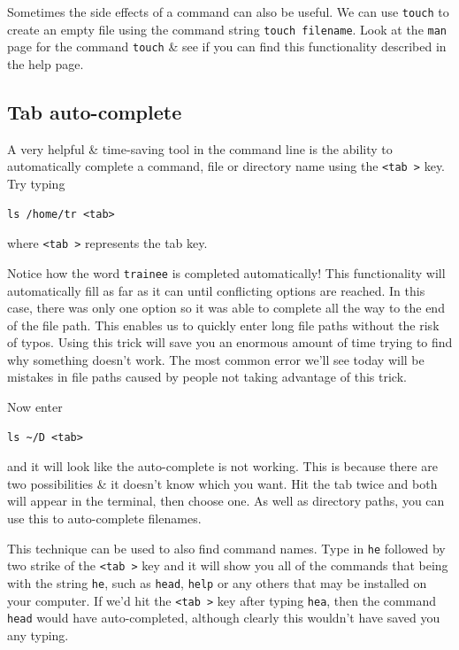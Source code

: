 \documentclass[a4paper,12pt,twoside]{memoir}
\begin{document}
\begin{bonus}
Sometimes the side effects of a command can also be useful. 
We can use \texttt{touch} to create an empty file using the command string \texttt{touch filename}.
Look at the \texttt{man} page for the command \texttt{touch} \& see if you can find this functionality described in the help page. \\
\end{bonus}

\subsection{Tab auto-complete}
\begin{steps}
A very helpful \& time-saving tool in the command line is the ability to automatically complete a command, file or directory name using the \texttt{\textless tab \textgreater} key.
Try typing 
\begin{lstlisting}
ls /home/tr <tab>
\end{lstlisting}
where \texttt{\textless tab \textgreater} represents the tab key.
\end{steps}
\begin{information}
Notice how the word \texttt{trainee} is completed automatically!
This functionality will automatically fill as far as it can until conflicting options are reached.
In this case, there was only one option so it was able to complete all the way to the end of the file path. 
This enables us to quickly enter long file paths without the risk of typos. 
Using this trick will save you an enormous amount of time trying to find why something doesn't work.
The most common error we'll see today will be mistakes in file paths caused by people not taking advantage of this trick.\\
\end{information}

\begin{steps}
Now enter
\begin{lstlisting}
ls ~/D <tab>
\end{lstlisting}
and it will look like the auto-complete is not working.
This is because there are two possibilities \& it doesn't know which you want.
Hit the tab twice and both will appear in the terminal, then choose one.
As well as directory paths, you can use this to auto-complete filenames.
\end{steps}

\begin{advanced}
This technique can be used to also find command names.
Type in \texttt{he} followed by two strike of the \texttt{\textless tab \textgreater} key and it will show you all of the commands that being with the string \texttt{he}, such as \texttt{head}, \texttt{help} or any others that may be installed on your computer.
If we'd hit the \texttt{\textless tab \textgreater} key after typing \texttt{hea}, then the command \texttt{head} would have auto-completed, although clearly this wouldn't have saved you any typing.
\end{advanced}
\end{document}
